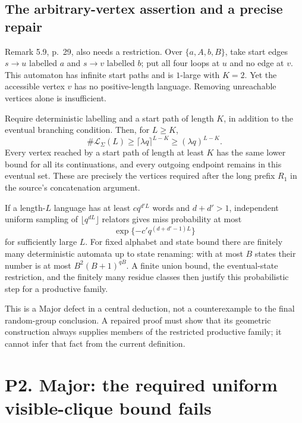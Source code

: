 \documentclass[10pt]{article}
\begin{document}
\subsection*{The arbitrary-vertex assertion and a precise repair}
Remark 5.9, p. 29, also needs a restriction. Over \(\{a,A,b,B\}\), take start edges \(s\to u\) labelled \(a\) and \(s\to v\) labelled \(b\); put all four loops at \(u\) and no edge at \(v\). This automaton has infinite start paths and is \(1\)-large with \(K=2\). Yet the accessible vertex \(v\) has no positive-length language. Removing unreachable vertices alone is insufficient.\par
Require deterministic labelling and a start path of length \(K\), in addition to the eventual branching condition. Then, for \(L\ge K\), \[\#\mathcal L_\Sigma(L)\ge
 \lceil\lambda q\rceil^{L-K}\ge(\lambda q)^{L-K}.\] Every vertex reached by a start path of length at least \(K\) has the same lower bound for all its continuations, and every outgoing endpoint remains in this eventual set. These are precisely the vertices required after the long prefix \(R_1\) in the source’s concatenation argument.\par
If a length-\(L\) language has at least \(c q^{d'L}\) words and \(d+d'>1\), independent uniform sampling of \(\lfloor q^{dL}\rfloor\) relators gives miss probability at most \[\exp\{-c' q^{(d+d'-1)L}\}\] for sufficiently large \(L\). For fixed alphabet and state bound there are finitely many deterministic automata up to state renaming: with at most \(B\) states their number is at most \(B^2(B+1)^{qB}\). A finite union bound, the eventual-state restriction, and the finitely many residue classes then justify this probabilistic step for a productive family.\par
This is a Major defect in a central deduction, not a counterexample to the final random-group conclusion. A repaired proof must show that its geometric construction always supplies members of the restricted productive family; it cannot infer that fact from the current definition.\par
\section*{P2. Major: the required uniform visible-clique bound fails}
\end{document}
